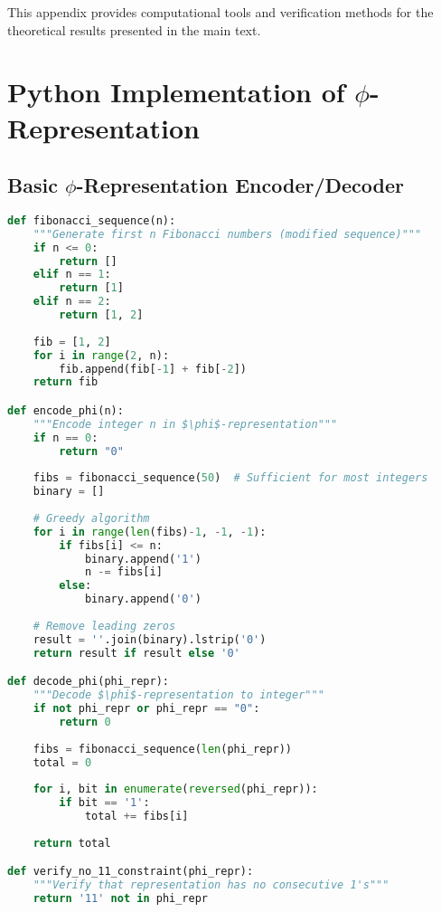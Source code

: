
This appendix provides computational tools and verification methods for the theoretical results presented in the main text.

\section{Python Implementation of $\phi$-Representation}

\subsection{Basic $\phi$-Representation Encoder/Decoder}

\begin{lstlisting}[language=Python, caption=$\phi$-Representation Implementation]
def fibonacci_sequence(n):
    """Generate first n Fibonacci numbers (modified sequence)"""
    if n <= 0:
        return []
    elif n == 1:
        return [1]
    elif n == 2:
        return [1, 2]
    
    fib = [1, 2]
    for i in range(2, n):
        fib.append(fib[-1] + fib[-2])
    return fib

def encode_phi(n):
    """Encode integer n in $\phi$-representation"""
    if n == 0:
        return "0"
    
    fibs = fibonacci_sequence(50)  # Sufficient for most integers
    binary = []
    
    # Greedy algorithm
    for i in range(len(fibs)-1, -1, -1):
        if fibs[i] <= n:
            binary.append('1')
            n -= fibs[i]
        else:
            binary.append('0')
    
    # Remove leading zeros
    result = ''.join(binary).lstrip('0')
    return result if result else '0'

def decode_phi(phi_repr):
    """Decode $\phi$-representation to integer"""
    if not phi_repr or phi_repr == "0":
        return 0
    
    fibs = fibonacci_sequence(len(phi_repr))
    total = 0
    
    for i, bit in enumerate(reversed(phi_repr)):
        if bit == '1':
            total += fibs[i]
    
    return total

def verify_no_11_constraint(phi_repr):
    """Verify that representation has no consecutive 1's"""
    return '11' not in phi_repr
\end{lstlisting}

